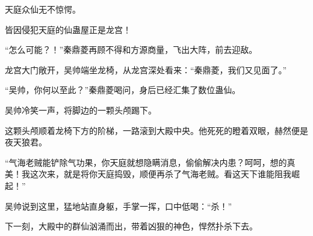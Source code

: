 \begin{this_body}
天庭众仙无不惊愕。

皆因侵犯天庭的仙蛊屋正是龙宫！

“怎么可能？！”秦鼎菱再顾不得和方源商量，飞出大阵，前去迎敌。

龙宫大门敞开，吴帅端坐龙椅，从龙宫深处看来：“秦鼎菱，我们又见面了。”

“吴帅，你何以至此？”秦鼎菱喝问，身后已经汇集了数位蛊仙。

吴帅冷笑一声，将脚边的一颗头颅踢下。

这颗头颅顺着龙椅下方的阶梯，一路滚到大殿中央。他死死的瞪着双眼，赫然便是夜天狼君。

“气海老贼能铲除气功果，你天庭就想隐瞒消息，偷偷解决内患？呵呵，想的真美！我这次来，就是将你天庭捣毁，顺便再杀了气海老贼。看这天下谁能阻我崛起！”

吴帅说到这里，猛地站直身躯，手掌一挥，口中低喝：“杀！”

下一刻，大殿中的群仙汹涌而出，带着凶狠的神色，悍然扑杀下去。

\end{this_body}

